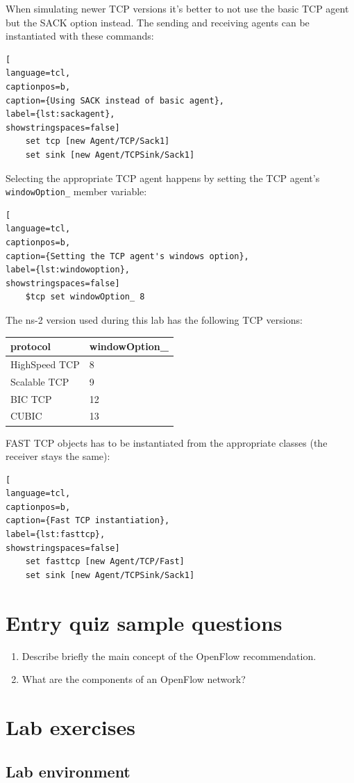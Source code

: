 \documentclass[a4paper]{article}
\begin{document}
When simulating newer TCP versions it's better to not use the basic TCP agent but the SACK option instead. The sending
and receiving agents can be instantiated with these commands:

\begin{lstlisting}[
language=tcl,
captionpos=b,
caption={Using SACK instead of basic agent},
label={lst:sackagent},
showstringspaces=false]
    set tcp [new Agent/TCP/Sack1]
    set sink [new Agent/TCPSink/Sack1]
\end{lstlisting}

Selecting the appropriate TCP agent happens by setting the TCP agent's \verb!windowOption_! member variable:

\begin{lstlisting}[
language=tcl,
captionpos=b,
caption={Setting the TCP agent's windows option},
label={lst:windowoption},
showstringspaces=false]
    $tcp set windowOption_ 8
\end{lstlisting}

The ns-2 version used during this lab has the following TCP versions:

\begin{tabular}{|l|l|}
    \hline
    \cellcolor{blue!25} \textbf{protocol} & \cellcolor{blue!25} \textbf{windowOption\_}  \\\hline
    HighSpeed TCP                         & 8                                            \\\hline
    Scalable TCP                          & 9                                            \\\hline
    BIC TCP                               & 12                                           \\\hline
    CUBIC                                 & 13                                           \\\hline
\end{tabular}

\hfill \break
FAST TCP objects has to be instantiated from the appropriate classes (the receiver stays the same):

\begin{lstlisting}[
language=tcl,
captionpos=b,
caption={Fast TCP instantiation},
label={lst:fasttcp},
showstringspaces=false]
    set fasttcp [new Agent/TCP/Fast]
    set sink [new Agent/TCPSink/Sack1]
\end{lstlisting}




\appendix

\section{Entry quiz sample questions}

\begin{enumerate}
    \item Describe briefly the main concept of the OpenFlow recommendation.
    \item What are the components of an OpenFlow network?
\end{enumerate}

\section{Lab exercises}

\subsection{Lab environment}
\end{document}
